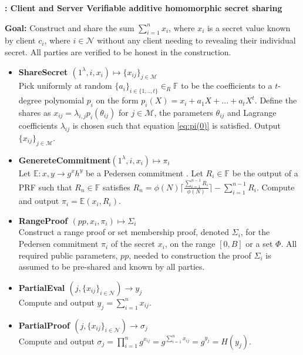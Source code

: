 \begin{algorithm}
\caption{\textbf{: Client and Server Verifiable additive homomorphic secret sharing}}

\textbf{Goal:} Construct and share the sum $\sum_{i=1}^n x_i$, where $x_i$ is a secret value known by client $c_i$, where $i\in\mathcal{N}$ without any client needing to revealing their individual secret. All parties are verified to be honest in the construction.
\vspace{2pt}
\hline
\vspace{2pt}
\begin{itemize}
 \item\textbf{ShareSecret $(1^\lambda,i,x_i) \mapsto \{x_{ij}\}_{j\in\mathcal{M}}$} \\
Pick uniformly at random $\{a_i\}_{i\in\{1,..,t\}}\in_R\mathds{F}$ to be the coefficients to a $t$-degree polynomial $p_i$ on the form $p_i(X) = x_i + a_1X+...+a_tX^t$. Define  the shares as $x_{ij}=\lambda_{i,j}p_i(\theta_{ij})$ for $j\in\mathcal{M}$, the parameters $\theta_{ij}$ and Lagrange coefficients $\lambda_{ij}$ is chosen such that equation \ref{eq:pi(0)} is satisfied.
Output $\{x_{ij}\}_{j\in\mathcal{M}}$.

\item\textbf{GenereteCommitment$(1^\lambda,i,x_i) \mapsto \pi_i$ }\\
Let $\mathds{E} : x,y \to g^xh^y$ be a Pedersen commitment . Let $R_i\in\mathds{F}$ be the output of a PRF such that $R_n\in \mathds{F}$  satisfies $R_n = \phi(N)\lceil \frac{\sum_{i=1}^{n-1}R_i}{\phi(N)}\rceil- \sum_{i=1}^{n-1}R_i $. Compute and output $\pi_i = \mathds{E}(x_i,R_i)$.

\item\textbf{RangeProof $(pp,x_i,\pi_i) \mapsto \Sigma_i$}\\
Construct a range proof or set membership proof, denoted $\Sigma_i$, for the Pedersen commitment $\pi_i$ of the secret $x_i$, on the  range $[0,B]$ or a set $\Phi$. All required public parameters, $pp$, needed to  construction the proof $\Sigma_i$ is assumed to be pre-shared and known by all parties.
\item\textbf{PartialEval $(j,\{x_{ij}\}_{i\in\mathcal{N}})\xrightarrow[]{}y_j$}\\
Compute and output $y_j = \sum_{i=1}^n x_{ij}$.

\item\textbf{PartialProof $(j,\{x_{ij}\}_{i\in\mathcal{N}})\xrightarrow[]{}\sigma_j$}\\
Compute and output $\sigma_j = \prod_{i=1}^n g^{x_{ij}} =  g^{\sum_{i=1}^n x_{ij}}= g^{y_j}=H(y_j)$.


\end{itemize}
\end{algorithm}
